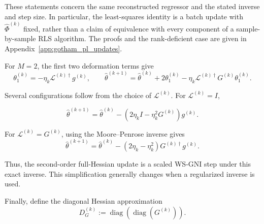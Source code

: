 \documentclass[11pt]{article}
\newenvironment{updaterule}[2]{%
  \begin{tcolorbox}[
    colback=#1!6!white, colframe=#1!65!black,
    colbacktitle=#1!12!white, coltitle=#1!45!black,
    title={#2}, halign title=right,
    fonttitle=\normalfont\sffamily\bfseries\small,
    boxrule=.5pt, arc=0pt, outer arc=0pt,
    left=2mm, right=2mm, top=0mm, bottom=0mm,
    toptitle=1mm, bottomtitle=1mm,
    before skip=8pt, after skip=8pt]
}{\end{tcolorbox}}
\theoremstyle{remark}
\begin{document}
These statements concern the same reconstructed regressor and the stated
inverse and step size. In particular, the least-squares identity is a
batch update with $\hat\Phi^{(k)}$ fixed, rather than a claim of equivalence
with every component of a sample-by-sample RLS algorithm. The proofs
and the rank-deficient case are given in Appendix~\ref{app:gotham_pl_updates}.

For $M=2$, the first two deformation terms give
\begin{equation}
\label{eq:gradient_root_second_order_general}
    \theta_1^{(k)}
    =
    -\eta_k\mathcal{L}^{(k)\dagger}g^{(k)},
    \qquad
    \hat{\theta}^{(k+1)}
    =
    \hat{\theta}^{(k)}
    +
    2\theta_1^{(k)}
    -
    \eta_k
    \mathcal{L}^{(k)\dagger}
    G^{(k)}\theta_1^{(k)}.
\end{equation}

Several configurations follow from the choice of $\mathcal L^{(k)}$.
For $\mathcal L^{(k)}=I$,
\begin{updaterule}{RuleIdentity}{GHAM-2-I (PL)}
\begin{equation}
\label{eq:GGHAM2_identity}
    \hat{\theta}^{(k+1)}
    =
    \hat{\theta}^{(k)}
    -
    \left(
    2\eta_k I
    -
    \eta_k^2 G^{(k)}
    \right)
    g^{(k)}.
\end{equation}
\end{updaterule}

For $\mathcal L^{(k)}=G^{(k)}$, using the Moore--Penrose inverse gives
\begin{equation}
\label{eq:GGHAM2_hessian}
    \hat{\theta}^{(k+1)}
    =
    \hat{\theta}^{(k)}
    -
    \left(
    2\eta_k-\eta_k^2
    \right)
    G^{(k)\dagger}g^{(k)}.
\end{equation}

Thus, the second-order full-Hessian update is a scaled WS-GNI step
under this exact inverse. This simplification generally changes when
a regularized inverse is used.

Finally, define the diagonal Hessian approximation
\begin{equation}
\label{eq:DG_definition}
    D_G^{(k)}
    :=
    \operatorname{diag}
    \left(
    \operatorname{diag}
    \left(
    G^{(k)}
    \right)
    \right).
\end{equation}
\end{document}
